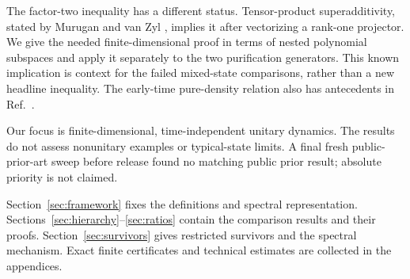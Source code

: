 The factor-two inequality has a different status. Tensor-product
superadditivity, stated by Murugan and van Zyl
\cite[Sec.~2, Eq.~(2.4)]{MuruganVanZyl2026}, implies it after vectorizing a
rank-one projector. We give the needed finite-dimensional proof in terms of
nested polynomial subspaces and apply it separately to the two purification
generators. This known implication is context for the failed mixed-state
comparisons, rather than a new headline inequality. The early-time
pure-density relation also has antecedents in Ref.~\cite{Caputa2024}.

Our focus is finite-dimensional, time-independent unitary dynamics. The
results do not assess nonunitary examples or typical-state limits. A final fresh
public-prior-art sweep before release found no matching
public prior result; absolute priority
is not claimed.

Section~\ref{sec:framework} fixes the definitions and spectral representation.
Sections~\ref{sec:hierarchy}--\ref{sec:ratios} contain the comparison results
and their proofs. Section~\ref{sec:survivors} gives restricted survivors and
the spectral mechanism. Exact finite certificates and technical estimates
are collected in the appendices.
